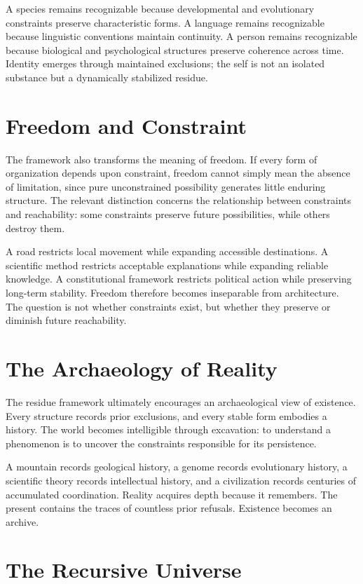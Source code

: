\documentclass[11pt,oneside]{book}
\theoremstyle{plain}
\theoremstyle{definition}
\theoremstyle{remark}
\begin{document}
A species remains recognizable because developmental and evolutionary constraints preserve characteristic forms. A language remains recognizable because linguistic conventions maintain continuity. A person remains recognizable because biological and psychological structures preserve coherence across time. Identity emerges through maintained exclusions; the self is not an isolated substance but a dynamically stabilized residue.

\section{Freedom and Constraint}

The framework also transforms the meaning of freedom. If every form of organization depends upon constraint, freedom cannot simply mean the absence of limitation, since pure unconstrained possibility generates little enduring structure. The relevant distinction concerns the relationship between constraints and reachability: some constraints preserve future possibilities, while others destroy them.

A road restricts local movement while expanding accessible destinations. A scientific method restricts acceptable explanations while expanding reliable knowledge. A constitutional framework restricts political action while preserving long-term stability. Freedom therefore becomes inseparable from architecture. The question is not whether constraints exist, but whether they preserve or diminish future reachability.

\section{The Archaeology of Reality}

The residue framework ultimately encourages an archaeological view of existence. Every structure records prior exclusions, and every stable form embodies a history. The world becomes intelligible through excavation: to understand a phenomenon is to uncover the constraints responsible for its persistence.

A mountain records geological history, a genome records evolutionary history, a scientific theory records intellectual history, and a civilization records centuries of accumulated coordination. Reality acquires depth because it remembers. The present contains the traces of countless prior refusals. Existence becomes an archive.

\section{The Recursive Universe}
\end{document}
